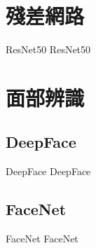 \documentclass[class=NCU_thesis, crop=false]{standalone}
\begin{document}



\section{殘差網路}
ResNet50 ResNet50

\section{面部辨識}
\subsection{DeepFace}
DeepFace DeepFace

\subsection{FaceNet}
FaceNet FaceNet
\end{document}
